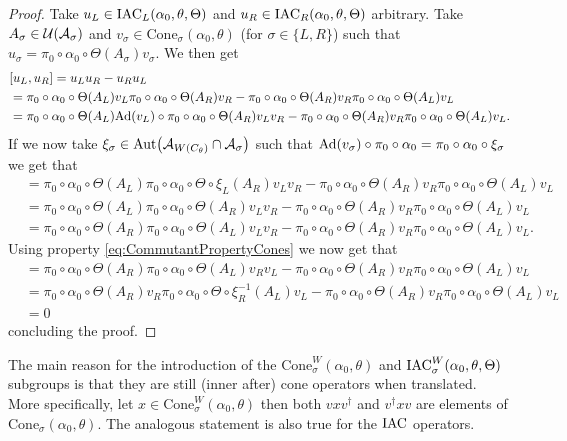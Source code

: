 \documentclass[12pt,a4paper,twoside]{article}
\numberwithin{equation}{section}
\begin{document}
\begin{proof}
	Take $u_L\in\textrm{IAC}_L(\alpha_0,\theta,\Theta)$ and $u_R\in\textrm{IAC}_R(\alpha_0,\theta,\Theta)$ arbitrary. Take $A_\sigma\in\mathcal U(\mathcal A_\sigma)$ and $v_\sigma\in\textrm{Cone}_\sigma(\alpha_0,\theta)$ (for $\sigma\in\{L,R\}$) such that $u_\sigma=\pi_0\circ\alpha_0\circ\Theta(A_\sigma)v_\sigma$. We then get
	\begin{align}
		&[u_L,u_R]=u_Lu_R-u_Ru_L\\
		&=\pi_0\circ\alpha_0\circ\Theta(A_L)v_L\pi_0\circ\alpha_0\circ\Theta(A_R)v_R-\pi_0\circ\alpha_0\circ\Theta(A_R)v_R\pi_0\circ\alpha_0\circ\Theta(A_L)v_L\\
		&=\pi_0\circ\alpha_0\circ\Theta(A_L)\Ad{v_L}\circ\pi_0\circ\alpha_0\circ\Theta(A_R)v_Lv_R-\pi_0\circ\alpha_0\circ\Theta(A_R)v_R\pi_0\circ\alpha_0\circ\Theta(A_L)v_L.
	\end{align}
	If we now take $\xi_\sigma\in\Aut{\AA_{W(C_\theta)}\cap\AA_\sigma}$ such that $\Ad{v_\sigma}\circ\pi_0\circ\alpha_0=\pi_0\circ\alpha_0\circ\xi_\sigma$ we get that
	\begin{align}
		&=\pi_0\circ\alpha_0\circ\Theta(A_L)\pi_0\circ\alpha_0\circ\Theta\circ\xi_L(A_R)v_Lv_R-\pi_0\circ\alpha_0\circ\Theta(A_R)v_R\pi_0\circ\alpha_0\circ\Theta(A_L)v_L\\
		&=\pi_0\circ\alpha_0\circ\Theta(A_L)\pi_0\circ\alpha_0\circ\Theta(A_R)v_Lv_R-\pi_0\circ\alpha_0\circ\Theta(A_R)v_R\pi_0\circ\alpha_0\circ\Theta(A_L)v_L\\
		&=\pi_0\circ\alpha_0\circ\Theta(A_R)\pi_0\circ\alpha_0\circ\Theta(A_L)v_Lv_R-\pi_0\circ\alpha_0\circ\Theta(A_R)v_R\pi_0\circ\alpha_0\circ\Theta(A_L)v_L.
	\end{align}
	Using property \eqref{eq:CommutantPropertyCones} we now get that
	\begin{align}
		&=\pi_0\circ\alpha_0\circ\Theta(A_R)\pi_0\circ\alpha_0\circ\Theta(A_L)v_Rv_L-\pi_0\circ\alpha_0\circ\Theta(A_R)v_R\pi_0\circ\alpha_0\circ\Theta(A_L)v_L\\
		&=\pi_0\circ\alpha_0\circ\Theta(A_R)v_R\pi_0\circ\alpha_0\circ\Theta\circ\xi_R^{-1}(A_L)v_L-\pi_0\circ\alpha_0\circ\Theta(A_R)v_R\pi_0\circ\alpha_0\circ\Theta(A_L)v_L\\
		&=0
	\end{align}
	concluding the proof.
\end{proof}
\begin{remark}
	The main reason for the introduction of the $\textrm{Cone}_\sigma^W(\alpha_0,\theta)$ and $\textrm{IAC}^W_\sigma(\alpha_0,\theta,\Theta)$ subgroups is that they are still (inner after) cone operators when translated. More specifically, let $x\in\textrm{Cone}_\sigma^W(\alpha_0,\theta)$ then both $vxv^\dagger$ and $v^\dagger x v$ are elements of $\textrm{Cone}_\sigma(\alpha_0,\theta)$. The analogous statement is also true for the $\textrm{IAC}$ operators.
\end{remark}
\end{document}
